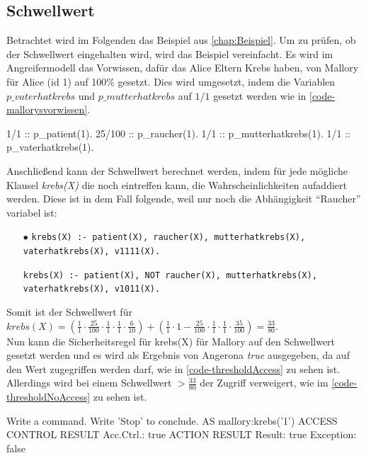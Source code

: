 \documentclass[german,version-2020-11]{uzl-thesis}
\begin{document}
\subsection{Schwellwert}\label{sub:schwellwert}
Betrachtet wird im Folgenden das Beispiel aus \autoref{chap:Beispiel}. Um zu prüfen, ob der Schwellwert eingehalten wird, wird das Beispiel vereinfacht. Es wird im Angreifermodell das Vorwissen, dafür das Alice Eltern Krebs haben, von Mallory für Alice (id 1) auf 100\% gesetzt. Dies wird umgesetzt, indem die Variablen $p\_vaterhatkrebs$ und $p\_mutterhatkrebs$ auf $1/1$ gesetzt werden wie in \autoref{code-mallorysvorwissen}.
\begin{Pseudocode}[caption={Mallorys Vorwissen}, label={code-mallorysvorwissen}]
1/1 :: p_patient(1).
25/100 :: p_raucher(1).
1/1 :: p_mutterhatkrebs(1).
1/1 :: p_vaterhatkrebs(1).
\end{Pseudocode}
Anschließend kann der Schwellwert berechnet werden, indem für jede mögliche Klausel \textit{krebs(X)} die noch eintreffen kann, die Wahrscheinlichkeiten aufaddiert werden. Diese ist in dem Fall folgende, weil nur noch die Abhängigkeit \enquote{Raucher} variabel ist:
\begin{itemize}
	\item[$\bullet$] \texttt{krebs(X) :- patient(X), raucher(X), mutterhatkrebs(X), vaterhatkrebs(X), v1111(X).}
	\item[\bullet] \texttt{krebs(X) :- patient(X), NOT raucher(X), mutterhatkrebs(X), vaterhatkrebs(X), v1011(X).}
\end{itemize}
Somit ist der Schwellwert für $krebs(X) = (\frac{1}{1} \cdot \frac{25}{100} \cdot \frac{1}{1} \cdot \frac{1}{1} \cdot \frac{6}{10}) + (\frac{1}{1} \cdot 1- \frac{25}{100} \cdot \frac{1}{1} \cdot \frac{1}{1} \cdot \frac{35}{100}) = \frac{33}{80} $. \\  Nun kann die Sicherheitsregel für krebs(X) für Mallory auf den Schwellwert gesetzt werden und es wird als Ergebnis von Angerona \textit{true} ausgegeben, da auf den Wert zugegriffen werden darf, wie in \autoref{code-thresholdAccess} zu sehen ist. Allerdings wird bei einem Schwellwert $ > \frac{33}{80}$ der Zugriff verweigert, wie im \autoref{code-thresholdNoAccess} zu sehen ist. 


\begin{Pseudocode}[caption={Angerona Ergebnis für Schwellwert=$\frac{33}{80}$}, label={code-thresholdAccess}]
Write a command. Write 'Stop' to conclude.
AS mallory:krebs('1')
ACCESS CONTROL RESULT
	Acc.Ctrl.: true
ACTION RESULT
	Result: true Exception: false
\end{Pseudocode}
\end{document}
